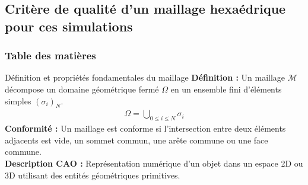 \documentclass{beamer}
\begin{document}
\subsection{Critère de qualité d'un maillage hexaédrique pour ces simulations}

\begin{frame}
    \frametitle{Table des matières}
    \tableofcontents[currentsubsection, sectionstyle=show/shaded, subsectionstyle=show/shaded/hide]
\end{frame}
\begin{frame}{Définition et propriétés fondamentales du maillage}
    \small{
        \textbf{Définition :} Un maillage $\mathcal{M}$ décompose un domaine géométrique fermé $\Omega$ en un ensemble fini d'éléments simples $(\sigma_i)_N$. 
        \begin{align*}
            \Omega = \bigcup_{0 \leq i \leq N}{\sigma_i}
        \end{align*}
    }
    \newline
    \small{
        \textbf{Conformité :} Un maillage est conforme si l'intersection entre deux éléments adjacents est vide, un sommet commun, une arête commune ou une face commune.\\
    }
    \vspace{0.5cm}
    \small{
        \textbf{Description CAO :} Représentation numérique d'un objet dans un espace 2D ou 3D utilisant des entités géométriques primitives.
    }
\end{frame}
\end{document}

